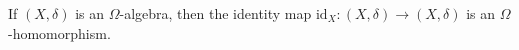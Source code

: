 If $(X, \delta)$ is an $\Omega$-algebra, then the identity map $\text{id}_X: (X, \delta) \longrightarrow (X, \delta)$ is an $\Omega$-homomorphism.

